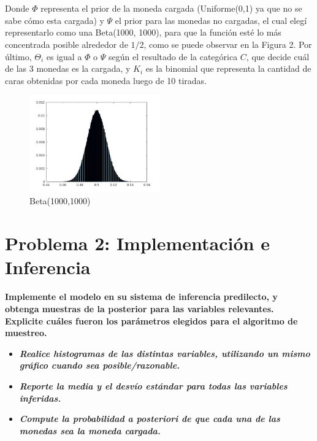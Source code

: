 ~\\ \\

Donde $\Phi$ representa el prior de la moneda cargada (Uniforme(0,1) ya que no se sabe cómo esta cargada) y $\Psi$ el prior para las monedas no cargadas, el cual elegí representarlo
como una Beta(1000, 1000), para que la función esté lo más concentrada posible alrededor de $1/2$, como se puede observar en la Figura 2. Por último, $\Theta_{i}$ es igual a $\Phi$ o $\Psi$ según
el resultado de la categórica $C$, que decide cuál de las 3 monedas es la cargada, y $K_{i}$ es la binomial que representa la cantidad de caras obtenidas por cada moneda luego de 10 tiradas.

\begin{figure}[h!]
  \centering
    \includegraphics[width=0.5\textwidth]{imagenes/beta-1000-1000.jpg}
  \caption{Beta(1000,1000)}
\end{figure}


\newpage
\section{Problema 2: Implementación e Inferencia}

\textbf{Implemente el modelo en su sistema de inferencia predilecto, y obtenga muestras de la posterior para las variables relevantes. Explicite cuáles fueron los parámetros
elegidos para el algoritmo de muestreo.}

\begin{itemize}
 \item \textbf{\textit{Realice histogramas de las distintas variables, utilizando un mismo gráfico cuando sea posible/razonable.}}
 \item \textbf{\textit{Reporte la media y el desvío estándar para todas las variables inferidas.}}
 \item \textbf{\textit{Compute la probabilidad a posteriori de que cada una de las monedas sea la moneda cargada.}}
\end{itemize}


